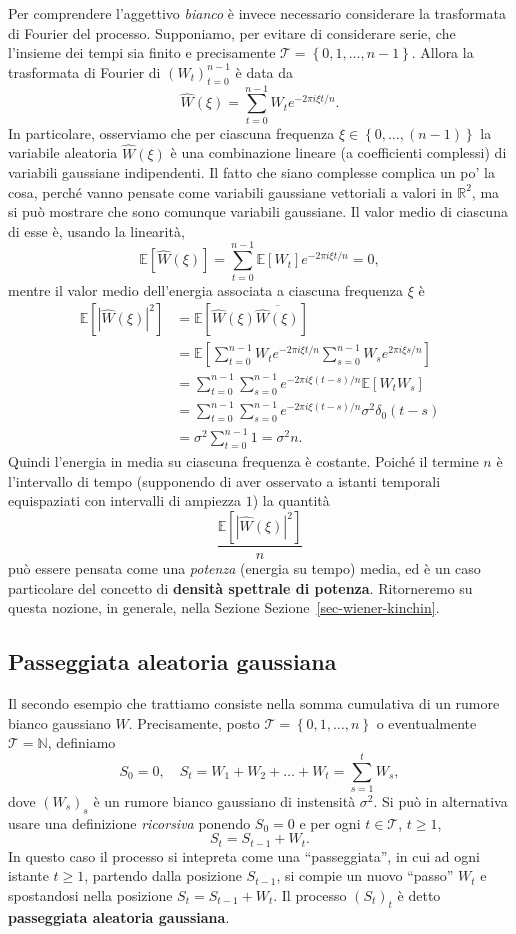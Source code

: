 \documentclass[
  italian,
  letterpaper,
]{book}
\newcommand{\sqa}[1]{\left[ #1 \right]}
\newcommand{\cur}[1]{\left\{ #1 \right\}}
\newcommand{\R}{\mathbb{R}}
\newcommand{\N}{\mathbb{N}}
\newcommand{\E}[1]{\mathbb{E}\sqa{#1}}
\theoremstyle{definition}
\theoremstyle{remark}
\begin{document}
Per comprendere l'aggettivo \emph{bianco} è invece necessario
considerare la trasformata di Fourier del processo. Supponiamo, per
evitare di considerare serie, che l'insieme dei tempi sia finito e
precisamente \(\mathcal{T} = \cur{0, 1, \ldots, n-1}\). Allora la
trasformata di Fourier di \((W_t)_{t=0}^{n-1}\) è data da
\[ \hat{W}(\xi) = \sum_{t=0}^{n-1} W_t e^{-2 \pi i \xi t/n}.\] In
particolare, osserviamo che per ciascuna frequenza
\(\xi \in \cur{0, \ldots, (n-1)}\) la variabile aleatoria
\(\hat{W}(\xi)\) è una combinazione lineare (a coefficienti complessi)
di variabili gaussiane indipendenti. Il fatto che siano complesse
complica un po' la cosa, perché vanno pensate come variabili gaussiane
vettoriali a valori in \(\R^2\), ma si può mostrare che sono comunque
variabili gaussiane. Il valor medio di ciascuna di esse è, usando la
linearità,
\[ \E{ \hat{W}(\xi)} = \sum_{t=0}^{n-1} \E{W_t} e^{-2 \pi i \xi t/n} =  0,\]
mentre il valor medio dell'energia associata a ciascuna frequenza
\(\xi\) è \[
\begin{split}
\E{ | \hat{W}(\xi) |^2 } &  = \E{  \hat{W}(\xi) \overline{ \hat{W} (\xi)} } \\
& = \E{ \sum_{t=0}^{n-1} W_te^{-2 \pi i \xi t/n}  \sum_{s=0}^{n-1} W_s e^{2 \pi i \xi s/n}}\\
&  = \sum_{t=0}^{n-1}\sum_{s=0}^{n-1} e^{-2 \pi i \xi (t-s) /n} \E{ W_t W_s}\\
& = \sum_{t=0}^{n-1}\sum_{s=0}^{n-1} e^{-2 \pi i \xi (t-s) /n} \sigma^2 \delta_0(t-s)\\
& = \sigma^2 \sum_{t=0}^{n-1} 1 = \sigma^2 n.
\end{split}\] Quindi l'energia in media su ciascuna frequenza è
costante. Poiché il termine \(n\) è l'intervallo di tempo (supponendo di
aver osservato a istanti temporali equispaziati con intervalli di
ampiezza \(1\)) la quantità \[  \frac{ \E{ | \hat{W}(\xi)|^2 } }{n}\]
può essere pensata come una \emph{potenza} (energia su tempo) media, ed
è un caso particolare del concetto di \textbf{densità spettrale di
potenza}. Ritorneremo su questa nozione, in generale, nella Sezione
Sezione~\ref{sec-wiener-kinchin}.

\subsection{Passeggiata aleatoria
gaussiana}\label{passeggiata-aleatoria-gaussiana}

Il secondo esempio che trattiamo consiste nella somma cumulativa di un
rumore bianco gaussiano \(W\). Precisamente, posto
\(\mathcal{T} = \cur{0,1, \ldots, n}\) o eventualmente
\(\mathcal{T} = \N\), definiamo
\[ S_0 = 0, \quad S_t = W_1+W_2+ \ldots +W_t = \sum_{s=1}^t W_s,\] dove
\((W_s)_{s}\) è un rumore bianco gaussiano di instensità \(\sigma^2\).
Si può in alternativa usare una definizione \emph{ricorsiva} ponendo
\(S_0 = 0\) e per ogni \(t \in \mathcal{T}\), \(t \ge 1\),
\[  S_t = S_{t-1} + W_t.\] In questo caso il processo si intepreta come
una ``passeggiata'', in cui ad ogni istante \(t \ge 1\), partendo dalla
posizione \(S_{t-1}\), si compie un nuovo ``passo'' \(W_t\) e
spostandosi nella posizione \(S_t = S_{t-1}+W_t\). Il processo
\((S_t)_{t}\) è detto \textbf{passeggiata aleatoria gaussiana}.
\end{document}
